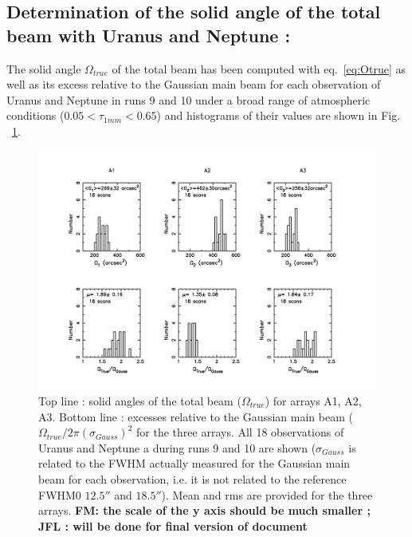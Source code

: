 \subsection{Determination of the solid angle of the total beam with Uranus and Neptune : }
\label{S:solang}


The solid angle $\Omega_{true}$ of the total beam has been computed with  eq.~\ref{eq:Otrue}
as well as its excess relative to the Gaussian main beam 
for each  observation of Uranus and Neptune in  runs 9 and 10 under a broad range of atmospheric conditions
($0.05 < \tau_{1mm} < 0.65$)  and histograms of their values are shown in Fig. ~\ref{fig:Otrue}.

\begin{figure}[th]
\begin{center}
  \includegraphics[clip, angle=0, scale=0.6]{Figures/Hist_omega_true_and_excess.pdf}
  \caption{Top line : solid angles of the total beam
    ($\Omega_{true}$) for arrays A1, A2, A3. Bottom line :  excesses relative to the Gaussian main beam
   ($\Omega_{true} / 2 \pi (\sigma_{Gauss})^2$ for the three
   arrays. All 18 observations of Uranus and Neptune a
   during runs 9 and 10 are shown ($\sigma_{Gauss}$ is related to the FWHM actually measured for the
   Gaussian main beam for each observation, i.e. it is not related to the reference FWHM0 $12.5''$ and $18.5''$).
   Mean and rms are provided for the three arrays. {\bf FM: the scale of the
     y axis should be much smaller ; JFL : will be done for final
    version of document}}
\label{fig:Otrue}
\end{center}
\end{figure}

